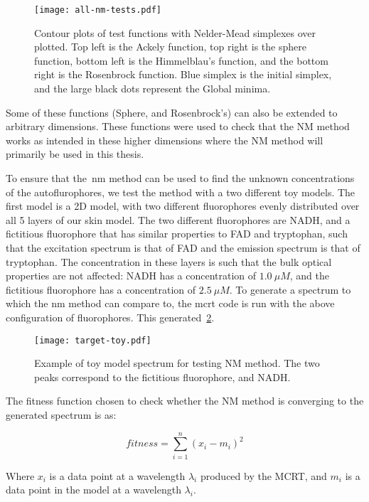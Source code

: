 \begin{figure}[!htbp]
    \centering
    \texttt{[image: all-nm-tests.pdf]}
    \caption{Contour plots of test functions with Nelder-Mead simplexes over plotted. Top left is the Ackely function, top right is the sphere function, bottom left is the Himmelblau's function, and the bottom right is the Rosenbrock function. Blue simplex is the initial simplex, and the large black dots represent the Global minima.}
    \label{fig:nmtest}
\end{figure}

Some of these functions (Sphere, and Rosenbrock's) can also be extended to arbitrary dimensions. These functions were used to check that the NM method works as intended in these higher dimensions where the NM method will primarily be used in this thesis.

To ensure that the~\gls*{nm} method can be used to find the unknown concentrations of the autoflurophores, we test the method with a two different toy models.
The first model is a 2D model, with two different fluorophores evenly distributed over all 5 layers of our skin model. 
The two different fluorophores are NADH, and a fictitious fluorophore that has similar properties to FAD and tryptophan, such that the excitation spectrum is that of FAD and the emission spectrum is that of tryptophan.
The concentration in these layers is such that the bulk optical properties are not affected: NADH has a concentration of $1.0~\mu M$, and the fictitious fluorophore has a concentration of $2.5~\mu M$.
To generate a spectrum to which the \gls*{nm} method can compare to, the \gls*{mcrt} code is run with the above configuration of fluorophores.
This generated~\cref{fig:toymodelspectra}.


\begin{figure}[!htbp]
  \centering
  \texttt{[image: target-toy.pdf]}
  \caption{Example of toy model spectrum for testing NM method. The two peaks correspond to the fictitious fluorophore, and NADH.}
  \label{fig:toymodelspectra}
\end{figure}

The fitness function chosen to check whether the NM method is converging to the generated spectrum is as:

\begin{equation}
fitness = \sum\limits_{i=1}^{n}(x_i-m_i)^2
\end{equation}

Where $x_i$ is a data point at a wavelength $\lambda_i$ produced by the MCRT, and $m_i$ is a data point in the model at a wavelength $\lambda_i$.

